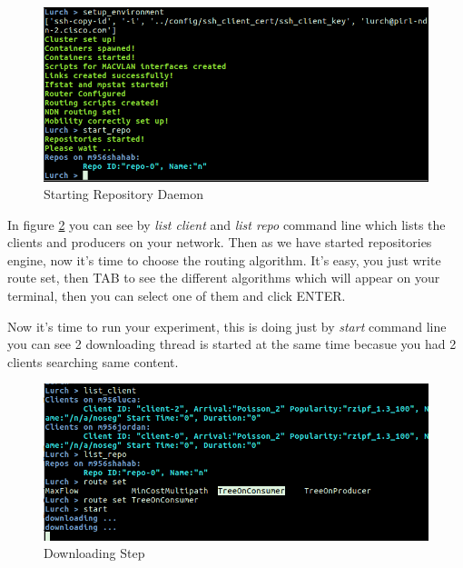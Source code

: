 \begin{figure}[H]

\begin{center}

\includegraphics[scale = 0.35]{Pictures/start_repo.png}

\caption{Starting Repository Daemon} \label{repo} 

\end{center}

\end{figure}




In figure \ref{download} you can see by \textit{list client} and \textit{list repo} command line which lists the clients and producers on your network. Then as we have started repositories engine, now it's time to choose the routing algorithm. It's easy, you just write route set, then TAB to see the different algorithms which will appear on your terminal, then you can select one of them and click ENTER.

Now it's time to run your experiment, this is doing just by \textit{start} command line you can see 2 downloading thread is started at the same time becasue you had 2 clients searching same content.  

\begin{figure}[H]

\begin{center}

\includegraphics[scale = 0.35]{Pictures/download.png}

\caption{Downloading Step} \label{download} 

\end{center}

\end{figure}


